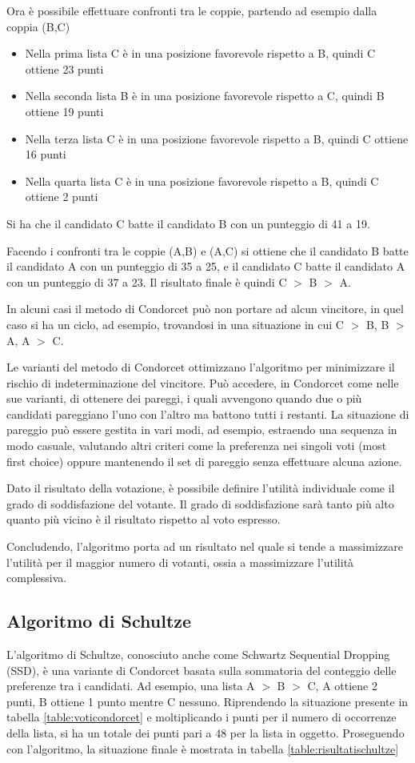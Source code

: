 \documentclass[12pt,a4paper,openright,twoside]{book}
\begin{document}
Ora è possibile effettuare confronti tra le coppie, partendo ad esempio dalla coppia (B,C)
\begin{itemize}
    \item{Nella prima lista C è in una posizione favorevole rispetto a B, quindi C ottiene 23 punti}
    \item{Nella seconda lista B è in una posizione favorevole rispetto a C, quindi B ottiene 19 punti}
    \item{Nella terza lista C è in una posizione favorevole rispetto a B, quindi C ottiene 16 punti}
    \item{Nella quarta lista C è in una posizione favorevole rispetto a B, quindi C ottiene 2 punti}
\end{itemize}

Si ha che il candidato C batte il candidato B con un punteggio di 41 a 19.

Facendo i confronti tra le coppie (A,B) e (A,C) si ottiene che il candidato
B batte il candidato A con un punteggio di 35 a 25, e il candidato C batte il candidato
A con un punteggio di 37 a 23. Il risultato finale è quindi C $>$ B $>$ A.

In alcuni casi il metodo di Condorcet può non portare ad alcun vincitore, in quel caso si
ha un ciclo, ad esempio, trovandosi in una situazione 
in cui C $>$ B, B $>$ A, A $>$ C.

Le varianti del metodo di Condorcet ottimizzano l'algoritmo per minimizzare il rischio
di indeterminazione del vincitore.
Può accedere, in Condorcet come nelle sue varianti, di ottenere dei pareggi,
i quali avvengono quando due o più candidati pareggiano l'uno con l'altro ma 
battono tutti i restanti. La situazione di pareggio può essere gestita in vari
modi, ad esempio, estraendo una sequenza in modo casuale, valutando altri criteri
come la preferenza nei singoli voti (most first choice) oppure mantenendo il set di pareggio
senza effettuare alcuna azione.

Dato il risultato della votazione, è possibile definire l'utilità individuale come il grado
di soddisfazione del votante. Il grado di soddisfazione sarà tanto più alto 
quanto più vicino è il risultato rispetto al voto espresso.

Concludendo, l'algoritmo porta ad un risultato nel quale si tende a massimizzare
l'utilità per il maggior numero di votanti, ossia a massimizzare l'utilità
complessiva. 

\subsection{Algoritmo di Schultze}
L'algoritmo di Schultze, conosciuto anche come Schwartz Sequential Dropping (SSD),
è una variante di Condorcet basata sulla sommatoria del conteggio delle preferenze tra i candidati.
Ad esempio, una lista A $>$ B $>$ C, A ottiene 2 punti, B ottiene 1 punto mentre C nessuno.
Riprendendo la situazione presente in tabella \ref{table:voticondorcet} e moltiplicando
i punti per il numero di occorrenze della lista, si ha un totale dei punti pari a 48
per la lista in oggetto.
Proseguendo con l'algoritmo, la situazione finale è mostrata in tabella \ref{table:risultatischultze}
\end{document}
